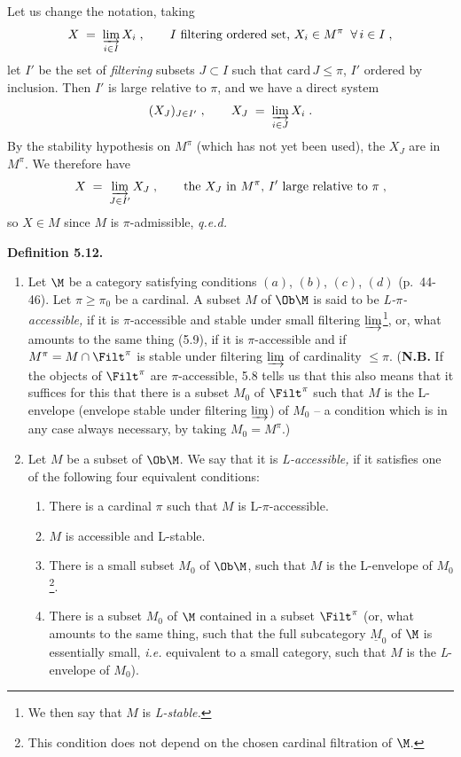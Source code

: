 Let us change the notation, taking
\[
X \;=\; \varinjlim_{i \in I} X_i \;, \qquad I \text{ filtering ordered set, } X_i \in M^\pi \;\; \forall\, i \in I \;,
\]
let $I'$ be the set of \textit{filtering} subsets $J \subset I$ such that $\mathrm{card}\, J \leq \pi$, $I'$ ordered by inclusion. Then $I'$ is large relative to $\pi$, and we have a direct system
\[
(X_J)_{J \in I'} \;, \qquad X_J \;=\; \varinjlim_{i \in J} X_i \;.
\]
By the stability hypothesis on $M^\pi$ (which has not yet been used), the $X_J$ are in $M^\pi$. We therefore have
\[
X \;=\; \varinjlim_{J \in I'} X_J \;, \qquad \text{the } X_J \text{ in } M^\pi\text{, } I' \text{ large relative to } \pi \;,
\]
so $X \in M$ since $M$ is $\pi$-admissible, \quad \textit{q.e.d.}


\textbf{Definition 5.12.}
\begin{enumerate}[label={}]
\item[1)] Let $\M$ be a category satisfying conditions $(a)$, $(b)$, $(c)$, $(d)$ (p.~44-46). Let $\pi \geq \pi_0$ be a cardinal. A subset $M$ of $\Ob\M$ is said to be \textit{L-$\pi$-accessible,} if it is $\pi$-accessible and stable under small filtering $\varinjlim$\footnote[24]{We then say that $M$ is \textit{L-stable.}}, or, what amounts to the same thing (5.9), if it is $\pi$-accessible and if $M^\pi = M \cap \Filt^\pi$ is stable under filtering $\varinjlim$ of cardinality $\leq \pi$. (\textbf{N.B.} If the objects of $\Filt^\pi$ are $\pi$-accessible, 5.8 tells us that this also means that it suffices for this that there is a subset $M_0$ of $\Filt^\pi$ such that $M$ is the L-envelope (envelope stable under filtering $\varinjlim$) of $M_0$ -- a condition which is in any case always necessary, by taking $M_0 = M^\pi$.)
\item[2)] Let $M$ be a subset of $\Ob\M$. We say that it is \textit{L-accessible,} if it satisfies one of the following four equivalent conditions:
\begin{enumerate}[label={}]
\item[\textit{a})] There is a cardinal $\pi$ such that $M$ is L-$\pi$-accessible.
\item[\textit{a}$'$)] $M$ is accessible and L-stable.
\item[\textit{b})] There is a small subset $M_0$ of $\Ob\M$, such that $M$ is the L-envelope of $M_0$\footnote[25]{This condition does not depend on the chosen cardinal filtration of $\M$.}.
\item[\textit{b}$'$)] There is a subset $M_0$ of $\M$ contained in a subset $\Filt^\pi$ (or, what amounts to the same thing, such that the full subcategory $\underline{M}_0$ of $\M$ is essentially small, \textit{i.e.} equivalent to a small category, such that $M$ is the \textit{L}-envelope of $M_0$).
\end{enumerate}
\end{enumerate}